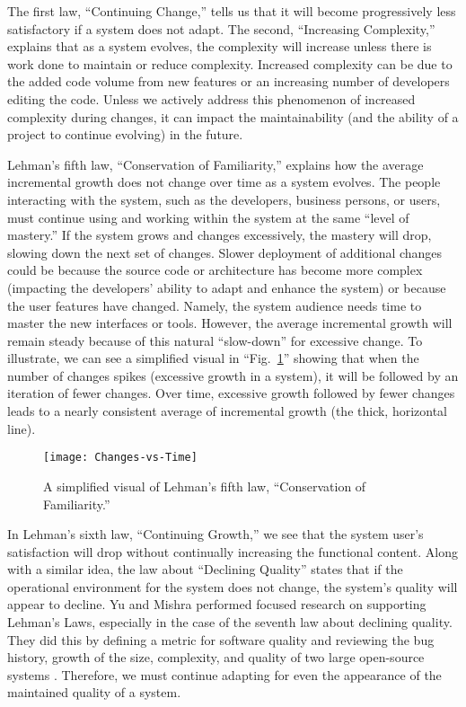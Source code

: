 The first law, ``Continuing Change,'' tells us that it will become progressively less satisfactory if a system does not adapt. The second, ``Increasing Complexity,'' explains that as a system evolves, the complexity will increase unless there is work done to maintain or reduce complexity. Increased complexity can be due to the added code volume from new features or an increasing number of developers editing the code. Unless we actively address this phenomenon of increased complexity during changes, it can impact the maintainability (and the ability of a project to continue evolving) in the future.

Lehman's fifth law, ``Conservation of Familiarity,'' explains how the average incremental growth does not change over time as a system evolves. The people interacting with the system, such as the developers, business persons, or users, must continue using and working within the system at the same ``level of mastery.'' If the system grows and changes excessively, the mastery will drop, slowing down the next set of changes. Slower deployment of additional changes could be because the source code or architecture has become more complex (impacting the developers' ability to adapt and enhance the system) or because the user features have changed. Namely, the system audience needs time to master the new interfaces or tools. However, the average incremental growth will remain steady because of this natural ``slow-down'' for excessive change. To illustrate, we can see a simplified visual in ``Fig.~\ref{figConservationOfFamiliarity}'' showing that when the number of changes spikes (excessive growth in a system), it will be followed by an iteration of fewer changes. Over time, excessive growth followed by fewer changes leads to a nearly consistent average of incremental growth (the thick, horizontal line).

\begin{figure}[ht]
    \centerline{
        \texttt{[image: Changes-vs-Time]}
    }
    \caption{A simplified visual of Lehman's fifth law, ``Conservation of Familiarity.''}
    \label{figConservationOfFamiliarity}
\end{figure}

In Lehman's sixth law, ``Continuing Growth,'' we see that the system user's satisfaction will drop without continually increasing the functional content. Along with a similar idea, the law about ``Declining Quality'' states that if the operational environment for the system does not change, the system's quality will appear to decline. Yu and Mishra performed focused research on supporting Lehman's Laws, especially in the case of the seventh law about declining quality. They did this by defining a metric for software quality and reviewing the bug history, growth of the size, complexity, and quality of two large open-source systems \cite{yu:2013}. Therefore, we must continue adapting for even the appearance of the maintained quality of a system.

